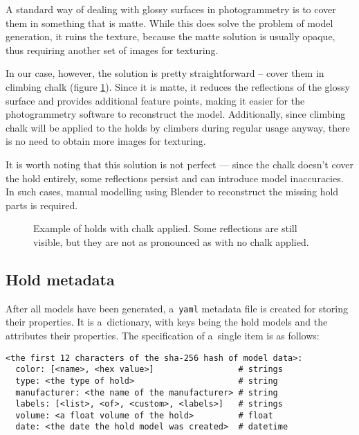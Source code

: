 A standard way of dealing with glossy surfaces in photogrammetry is to cover them in something that is matte.
While this does solve the problem of model generation, it ruins the texture, because the matte solution is usually opaque, thus requiring another set of images for texturing.

In our case, however, the solution is pretty straightforward -- cover them in climbing chalk (figure \ref{fig:chalk}).
Since it is matte, it reduces the reflections of the glossy surface and provides additional feature points, making it easier for the photogrammetry software to reconstruct the model.
Additionally, since climbing chalk will be applied to the holds by climbers during regular usage anyway, there is no need to obtain more images for texturing.

It is worth noting that this solution is not perfect --- since the chalk doesn't cover the hold entirely, some reflections persist and can introduce model inaccuracies.
In such cases, manual modelling using Blender \cite{blender} to reconstruct the missing hold parts is required.

\begin{figure}[t]
	\centering
	\hfill
	\hfill
	\caption{Example of holds with chalk applied. Some reflections are still visible, but they are not as pronounced as with no chalk applied.}%
	\label{fig:chalk}
\end{figure}

\subsection{Hold metadata}
After all models have been generated, a~\verb|yaml| metadata file is created for storing their properties.
It is a~dictionary, with keys being the hold models and the attributes their properties.
The specification of a~single item is as follows:

\begin{verbatim}
<the first 12 characters of the sha-256 hash of model data>:
  color: [<name>, <hex value>]                 # strings
  type: <the type of hold>                     # string
  manufacturer: <the name of the manufacturer> # string
  labels: [<list>, <of>, <custom>, <labels>]   # strings
  volume: <a float volume of the hold>         # float
  date: <the date the hold model was created>  # datetime
\end{verbatim}

